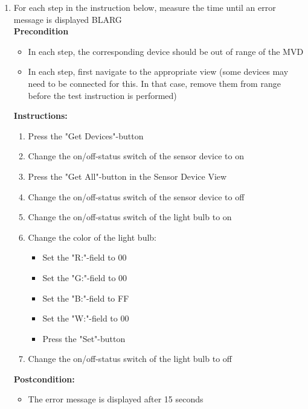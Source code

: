 \documentclass[a4paper]{article}
\newlength{\testlabellength}
\newenvironment{testlist}{\begin{enumerate}[label=\bfseries Instruction \thesubsection.\arabic* , labelindent=0pt, labelwidth=\testlabellength , leftmargin=2cm]}{\end{enumerate}}
\newenvironment{precondition}{
{\color{white}BLARG}\\ 
\textbf{Precondition}
\begin{itemize}[labelindent=0cm, labelwidth=2cm , leftmargin=1cm]
}
{\end{itemize}}
\newenvironment{instruction}{
\textbf{Instructions:}
\begin{enumerate}[label=\bfseries  \arabic*., labelindent=0cm, labelwidth=2cm , leftmargin=1cm]
}
{\end{enumerate}}
\newenvironment{postcondition}{
\textbf{Postcondition:}
\begin{itemize}[labelindent=0cm, labelwidth=2cm , leftmargin=1cm]
}
{\end{itemize}}
\begin{document}
\begin{appendices}
\begin{testlist}
	\item For each step in the instruction below, measure the time until an error message is displayed
		\begin{precondition} 
			\item In each step, the corresponding device should be out of range of the MVD
			\item In each step, first navigate to the appropriate view (some devices may need to be connected for this. In that case, remove them from range before the test instruction is performed)
		\end{precondition}
		\begin{instruction}
			\item Press the "Get Devices"-button
			\item Change the on/off-status switch of the sensor device to on
			\item Press the "Get All"-button in the Sensor Device View
			\item Change the on/off-status switch of the sensor device to off
			\item Change the on/off-status switch of the light bulb to on
			\item Change the color of the light bulb:
			\begin{itemize}
				\item Set the "R:"-field to 00
				\item Set the "G:"-field to 00
				\item Set the "B:"-field to FF
				\item Set the "W:"-field to 00
				\item Press the "Set"-button
			\end{itemize}
			\item Change the on/off-status switch of the light bulb to off
		\end{instruction}
		\begin{postcondition}
			\item The error message is displayed after 15 seconds %
		\end{postcondition}
	
\end{testlist}

\clearpage

\end{appendices}
\end{document}

